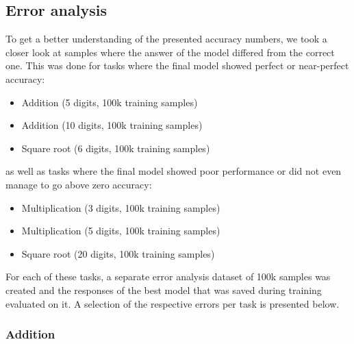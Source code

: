 
\subsection{Error analysis}
\label{error_analysis}

To get a better understanding of the presented accuracy numbers, we took a closer look at samples where the answer of the model differed from the correct one. This was done for tasks where the final model showed perfect or near-perfect accuracy:

\begin{itemize}
    \item Addition (5 digits, 100k training samples)
    \item Addition (10 digits, 100k training samples)
    \item Square root (6 digits, 100k training samples)
\end{itemize}

as well as tasks where the final model showed poor performance or did not even manage to go above zero accuracy:

\begin{itemize}
    \item Multiplication (3 digits, 100k training samples)
    \item Multiplication (5 digits, 100k training samples)
    \item Square root (20 digits, 100k training samples)
\end{itemize}

For each of these tasks, a separate error analysis dataset of 100k samples was created and the responses of the best model that was saved during training evaluated on it. A selection of the respective errors per task is presented below.

\subsubsection{Addition}

